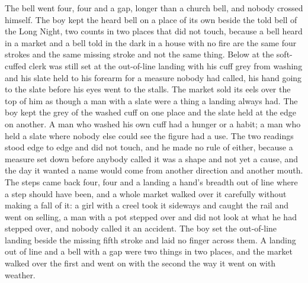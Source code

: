 The bell went four, four and a gap, longer than a church bell, and nobody crossed himself. The boy kept the heard bell on a place of its own beside the told bell of the Long Night, two counts in two places that did not touch, because a bell heard in a market and a bell told in the dark in a house with no fire are the same four strokes and the same missing stroke and not the same thing. Below  at  the soft-cuffed clerk was still set at the out-of-line landing with his cuff grey from washing and his slate held to his forearm for a measure nobody had called, his hand going to the slate before his eyes went to the stalls. The market sold its eels over the top of him as though a man with a slate were a thing a landing always had. The boy kept the grey of the washed cuff on one place and the slate held at the edge on another. A man who washed his own cuff had a hunger or a habit; a man who held a slate where nobody else could see the figure had a use. The two readings stood edge to edge and did not touch, and he made no rule of either, because a measure set down before anybody called it was a shape and not yet a cause, and the day it wanted a name would come from another direction and another mouth. The steps came back four, four and a landing a hand's breadth out of line where a step should have been, and a whole market walked over it carefully without making a fall of it: a girl with a creel took it sideways and caught the rail and went on selling, a man with a pot stepped over and did not look at what he had stepped over, and nobody called it an accident. The boy set the out-of-line landing beside the missing fifth stroke and laid no finger across them. A landing out of line and a bell with a gap were two things in two places, and the market walked over the first and went on with the second the way it went on with weather.

\scenebreak

